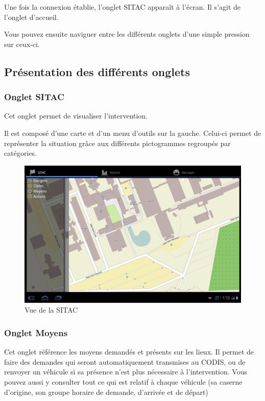 \documentclass{article}
\begin{document}
Une fois la connexion établie, l’onglet SITAC apparaît à l’écran. Il s’agit de l’onglet d’accueil.

Vous pouvez ensuite naviguer entre les différents onglets d’une simple pression sur ceux-ci.

\newpage
\subsection{Présentation des différents onglets}

\subsubsection{Onglet SITAC}

Cet onglet permet de visualiser l’intervention.

Il est composé d’une carte et d’un menu d’outils sur la gauche. Celui-ci permet de représenter la situation grâce aux différents pictogrammes regroupés par catégories.
\vspace{1.2in}
\begin{figure}[hbt]
\begin{center}
\includegraphics[width=470pt]{Manueldutilisation-fig001.png}
\caption{Vue de la SITAC}
\end{center}
\end{figure}

\newpage
\subsubsection{Onglet Moyens}

Cet onglet référence les moyens demandés et présents sur les lieux. Il permet de faire des demandes qui seront automatiquement transmises au CODIS, ou de renvoyer un véhicule si sa présence n’est plus nécessaire à l’intervention. Vous pouvez aussi y consulter tout ce qui est relatif à chaque véhicule (sa caserne d’origine, son groupe horaire de demande, d’arrivée et de départ)
\end{document}
